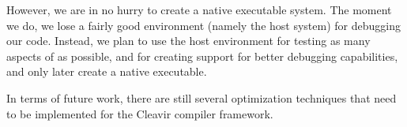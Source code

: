 However, we are in no hurry to create a native executable system.  The
moment we do, we lose a fairly good environment (namely the host
\commonlisp{} system) for debugging our code.  Instead, we plan to use
the host environment for testing as many aspects of \sicl{} as
possible, and for creating support for better debugging capabilities,
and only later create a native executable.

In terms of future work, there are still several optimization
techniques that need to be implemented for the Cleavir compiler
framework.
